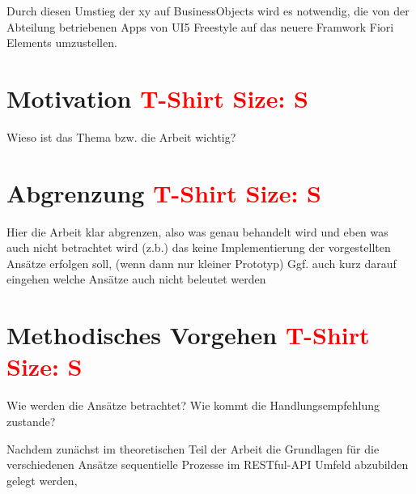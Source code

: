 Durch diesen Umstieg der xy auf BusinessObjects wird es notwendig, die von der Abteilung betriebenen Apps von UI5 Freestyle auf das neuere Framwork Fiori Elements umzustellen. 

\section{Motivation \textcolor{red}{T-Shirt Size: S}}

Wieso ist das Thema bzw. die Arbeit wichtig?



\section{Abgrenzung \textcolor{red}{T-Shirt Size: S}}

Hier die Arbeit klar abgrenzen, also was genau behandelt wird und eben was auch nicht betrachtet wird (z.b.) das keine Implementierung der vorgestellten Ansätze erfolgen soll, (wenn dann nur kleiner Prototyp)
Ggf. auch kurz darauf eingehen welche Ansätze auch nicht beleutet werden



\section{Methodisches Vorgehen \textcolor{red}{T-Shirt Size: S}}

Wie werden die Ansätze betrachtet? Wie kommt die Handlungsempfehlung zustande?

Nachdem zunächst im theoretischen Teil der Arbeit die Grundlagen für die verschiedenen Ansätze sequentielle Prozesse im RESTful-API Umfeld abzubilden gelegt werden, 